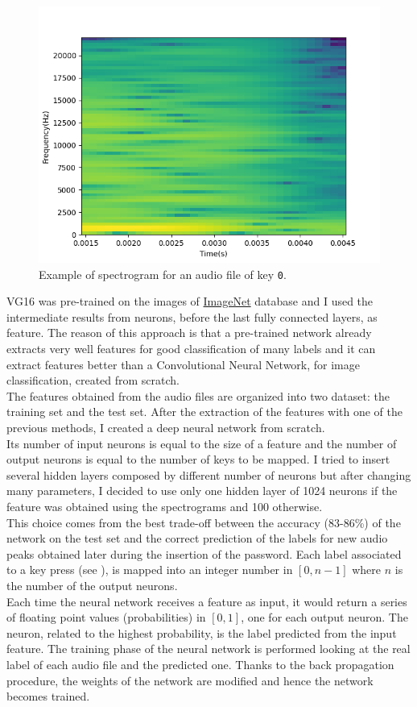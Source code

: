 \begin{figure}[H]
     \centering
     \includegraphics[width=.8\linewidth]{Images/AcCAPPCHA/spectrogram}
     \caption{\footnotesize{Example of spectrogram for an audio file of key \texttt{0}.}}\label{AcCAPPCHA:spectrogram}
\end{figure}
VG16 was pre-trained on the images of \href{http://www.image-net.org/}{ImageNet} database and I used the intermediate results from neurons, before the last fully connected layers, as feature. The reason of this approach is that a pre-trained network already extracts very well features for good classification of many labels and it can extract features better than a Convolutional Neural Network, for image classification, created from scratch.\\
The features obtained from the audio files are organized into two dataset: the training set and the test set. After the extraction of the features with one of the previous methods, I created a deep neural network from scratch.\\
Its number of input neurons is equal to the size of a feature and the number of output neurons is equal to the number of keys to be mapped. I tried to insert several hidden layers composed by different number of neurons but after changing many parameters, I decided to use only one hidden layer of 1024 neurons if the feature was obtained using the spectrograms and 100 otherwise. \\
This choice comes from the best trade-off between the accuracy (83-86\%) of the network on the test set and the correct prediction of the labels for new audio peaks obtained later during the insertion of the password. Each label associated to a key press (see ), is mapped into an integer number in $[0, n-1]$ where $n$ is the number of the output neurons.\\
Each time the neural network receives a feature as input, it would return a series of floating point values (probabilities) in $[0, 1]$, one for each output neuron. The neuron, related to the highest probability, is the label predicted from the input feature. The training phase of the neural network is performed looking at the real label of each audio file and the predicted one. Thanks to the back propagation procedure, the weights of the network are modified and hence the network becomes trained. 

